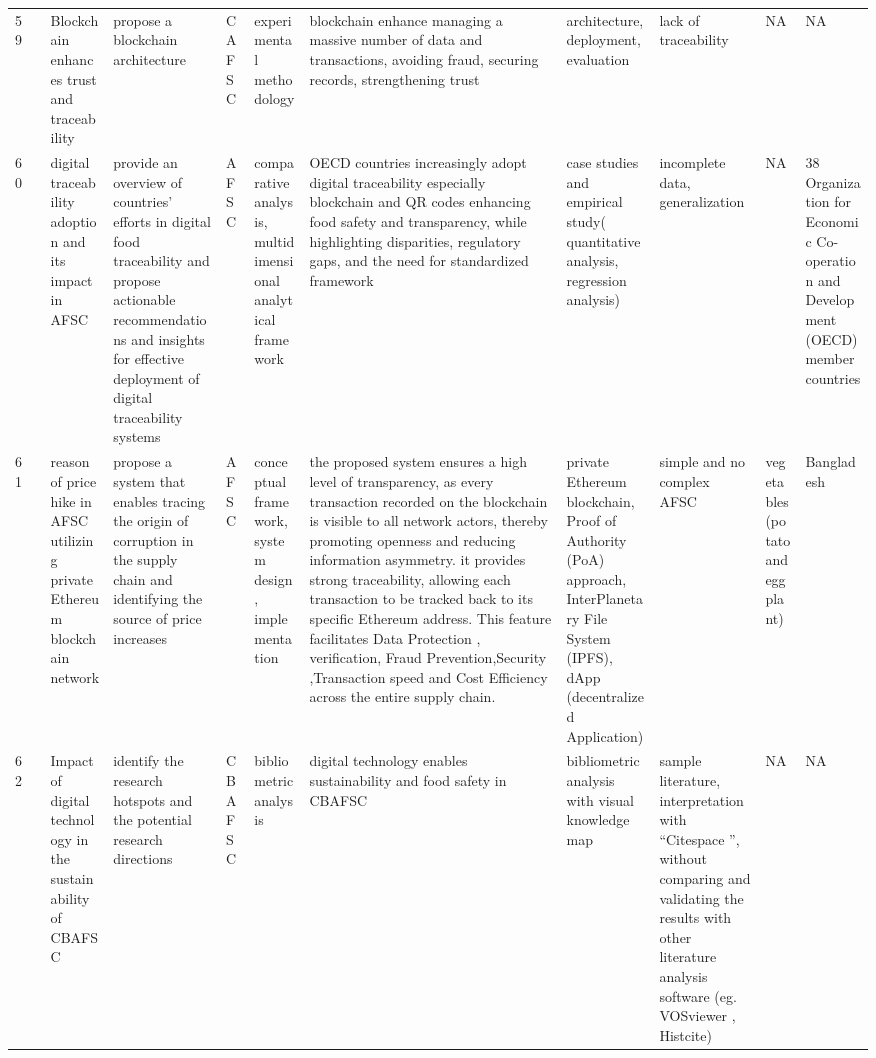 \documentclass[a4paper,10pt]{article}
\begin{document}
\begin{landscape}
\begin{small}
\begin{longtable}{p{0.5cm} p{2cm} p{2.5cm} p{4cm} p{1cm} p{2.5cm} p{5.5cm} p{2.5cm} p{2.5cm} p{1.8cm} p{1.5cm}}
59 & \textcite{Sakthivel34}  & Blockchain enhances trust and traceability & propose a blockchain architecture & CAFSC & experimental methodology& blockchain enhance managing a massive number of data and transactions, avoiding fraud, securing records, strengthening trust & architecture, deployment, evaluation &lack of traceability  & NA& NA \\
60 & \textcite{Charlebois35}  &digital traceability adoption and its impact in AFSC & provide an overview of countries’ efforts in digital food traceability and propose actionable recommendations and insights for effective deployment of digital traceability systems& AFSC & comparative analysis, multidimensional analytical framework&  OECD countries increasingly adopt digital traceability especially blockchain and QR codes enhancing food safety and transparency, while highlighting disparities, regulatory gaps, and the need for standardized framework & case studies and empirical study( quantitative analysis, regression analysis) & incomplete data, generalization&NA &38 Organization for Economic Co-operation and Development (OECD) member countries \\
61 & \textcite{Sayma36}  & reason of price hike in AFSC utilizing private Ethereum blockchain network & propose a system that enables tracing the origin of corruption in the supply chain and identifying the source of price increases & AFSC & conceptual framework, system design, implementation & the proposed system ensures a high level of transparency, as every transaction recorded on the blockchain is visible to all network actors, thereby promoting openness and reducing information asymmetry. it provides strong traceability, allowing each transaction to be tracked back to its specific Ethereum address. This feature facilitates Data Protection , verification, Fraud Prevention,Security ,Transaction speed and Cost Efficiency across the entire supply chain.& private Ethereum blockchain, Proof of Authority (PoA) approach, InterPlanetary File System (IPFS), dApp (decentralized Application)&  simple and no complex AFSC  & vegetables (potato and eggplant)& Bangladesh  \\
62 & \textcite{Wang37}  & Impact of digital technology in the sustainability of CBAFSC & identify the research hotspots and the potential research directions & CBAFSC & bibliometric analysis& digital technology enables sustainability and food safety in CBAFSC & bibliometric analysis with  visual knowledge map & sample literature, interpretation with “Citespace ”, without comparing and validating the results with other literature analysis software (eg. VOSviewer  , Histcite) &  NA& NA\\

\end{longtable}
\end{small}
\end{landscape}
\end{document}
